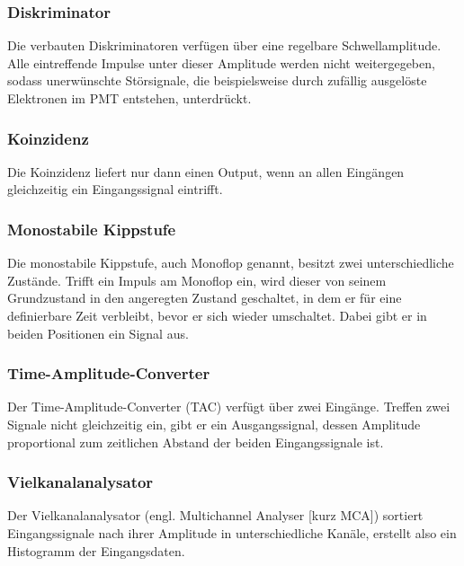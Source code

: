 \subsubsection{Diskriminator}

Die verbauten Diskriminatoren verfügen über eine regelbare Schwellamplitude. Alle eintreffende Impulse unter dieser Amplitude werden nicht weitergegeben, sodass unerwünschte Störsignale,
die beispielsweise durch zufällig ausgelöste Elektronen im PMT entstehen, unterdrückt.


\subsubsection{Koinzidenz}

Die Koinzidenz liefert nur dann einen Output, wenn an allen Eingängen gleichzeitig ein Eingangssignal eintrifft.


\subsubsection{Monostabile Kippstufe}

Die monostabile Kippstufe, auch Monoflop genannt, besitzt zwei unterschiedliche Zustände. Trifft ein Impuls am Monoflop ein, wird dieser von seinem Grundzustand in den angeregten Zustand geschaltet,
in dem er für eine definierbare Zeit verbleibt, bevor er sich wieder umschaltet. Dabei gibt er in beiden Positionen ein Signal aus.


\subsubsection{Time-Amplitude-Converter}

Der Time-Amplitude-Converter (TAC) verfügt über zwei Eingänge. Treffen zwei Signale nicht gleichzeitig ein, gibt er ein Ausgangssignal, dessen Amplitude proportional zum zeitlichen Abstand der beiden
Eingangssignale ist.


\subsubsection{Vielkanalanalysator}

Der Vielkanalanalysator (engl. Multichannel Analyser [kurz MCA]) sortiert Eingangssignale nach ihrer Amplitude in unterschiedliche Kanäle, erstellt also ein Histogramm der Eingangsdaten.





